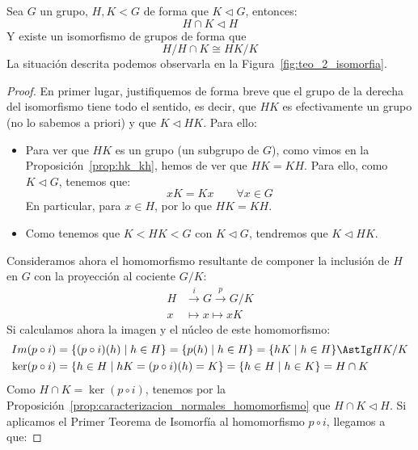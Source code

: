 \begin{teo}\label{teo:2_isomorfia}
    Sea $G$ un grupo, $H,K<G$ de forma que $K\lhd G$, entonces:
    \begin{equation*}
        H\cap K \lhd H
    \end{equation*}
    Y existe un isomorfismo de grupos de forma que
    \begin{equation*}
        H/H\cap K \cong HK/K
    \end{equation*}
    La situación descrita podemos observarla en la Figura~\ref{fig:teo_2_isomorfia}.
    \begin{proof}
        En primer lugar, justifiquemos de forma breve que el grupo de la derecha del isomorfismo tiene todo el sentido, es decir, que $HK$ es efectivamente un grupo (no lo sabemos a priori) y que $K\lhd HK$. Para ello:
        \begin{itemize}
            \item Para ver que $HK$ es un grupo (un subgrupo de $G$), como vimos en la Proposición~\ref{prop:hk_kh}, hemos de ver que $HK = KH$. Para ello, como $K\lhd G$, tenemos que:
                \begin{equation*}
                    xK = Kx \qquad \forall x\in G
                \end{equation*}
                En particular, para $x\in H$, por lo que $HK = KH$.
            \item Como tenemos que $K < HK < G$ con $K\lhd G$, tendremos que $K\lhd HK$.
        \end{itemize}
        Consideramos ahora el homomorfismo resultante de componer la inclusión de $H$ en $G$ con la proyección al cociente $G/K$:
        \begin{align*}
            H&\stackrel{i}{\longrightarrow} G \stackrel{p}{\longrightarrow} G/K \\
            x&\longmapsto x \longmapsto xK
        \end{align*}
        Si calculamos ahora la imagen y el núcleo de este homomorfismo:
        \begin{align*}
            Im(p\circ i) &= \{(p\circ i)(h) \mid h \in H\} = \{p(h) \mid h \in H \} = \{hK \mid h\in H\} \AstIg HK/K \\
            \ker(p\circ i) &= \{h\in H \mid hK = (p\circ i)(h) = K\} = \{h\in H \mid h\in K\} = H\cap K
        \end{align*}
        Como $H \cap K = \ker(p\circ i)$, tenemos por la Proposición~\ref{prop:caracterizacion_normales_homomorfismo} que $H\cap K\lhd H$. Si aplicamos el Primer Teorema de Isomorfía al homomorfismo $p\circ i$, llegamos a que:

\end{proof}
\end{teo}
